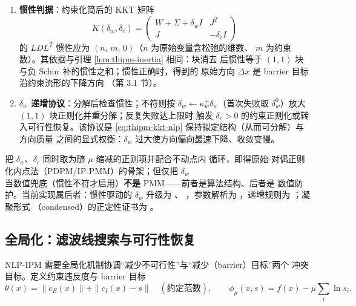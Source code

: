 \begin{enumerate}
  \item \textbf{惯性判据}：约束化简后的 KKT 矩阵
        \begin{equation}\label{eq:thipm-kkt-nlp}
          K(\delta_w,\delta_c)=
          \begin{pmatrix}
            W+\Sigma+\delta_w I & J^{T}\\
            J & -\delta_c I
          \end{pmatrix}
        \end{equation}
        的 $LDL^{T}$ 惯性应为 $(n,\,m,\,0)$（$n$ 为原始变量含松弛的维数、
        $m$ 为约束数）。其依据与引理 \ref{lem:thipm-inertia} 相同：块消去
        后惯性等于 $(1,1)$ 块与负 Schur 补的惯性之和；惯性正确时，得到的
        原始方向 $\Delta x$ 是 barrier 目标沿约束流形的下降方向
        \cite{ipmwachter2006}（第 3.1 节）。
  \item \textbf{$\delta_w$ 递增协议}：分解后检查惯性；不符则按
        $\delta_w\leftarrow\kappa_w^{+}\delta_w$（首次失败取
        $\delta_w^{0}$）放大 $(1,1)$ 块正则化并重分解；反复失败达上限时
        触发 $\delta_c>0$ 的约束正则化或转入可行性恢复。该协议是
        \eqref{eq:thipm-kkt-nlp} 保持拟定结构（从而可分解）与方向质量
        之间的显式权衡：$\delta_w$ 过大使方向偏向最速下降、收敛变慢。
\end{enumerate}

\begin{remark}\label{rem:thipm-pmm-boundary}
把 $\delta_w$、$\delta_c$ 同时取为随 $\mu$ 缩减的正则项并配合不动点内
循环，即得原始-对偶正则化内点法（PDPM/IP-PMM）的骨架；但仅把 $\delta_w$
当数值兜底（惯性不符才启用）\textbf{不是} PMM——前者是算法结构、后者是
数值防护。当前实现属后者：惯性驱动的 $\delta_w$ 升级为
、
，参数解析为
，递增规则为
；凝聚形式
（condensed）的正定性证书为
。
\end{remark}

\subsection{全局化：滤波线搜索与可行性恢复}\label{subsec:thipm-filter}

NLP-IPM 需要全局化机制协调``减少不可行性''与``减少（barrier）目标''两个
冲突目标。定义约束违反度与 barrier 目标
\begin{equation}\label{eq:thipm-theta-phi}
  \theta(x)=\|c_E(x)\|+\|c_I(x)-s\|\quad(\text{约定范数}),
  \qquad
  \phi_\mu(x,s)=f(x)-\mu\sum_{i}\ln s_i .
\end{equation}

